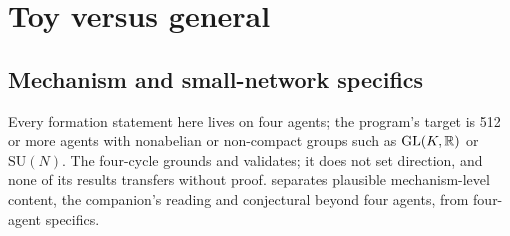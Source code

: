 \section{Toy versus general}
\label{comp:ch14-toy}

\subsection{Mechanism and small-network specifics}

Every formation statement here lives on four agents; the program's target is 512 or more agents with
nonabelian or non-compact groups such as $\mathrm{GL}(K,\mathbb R)$ or $\mathrm{SU}(N)$. The four-cycle grounds and
validates; it does not set direction, and none of its results transfers without proof.
 separates plausible mechanism-level content, the companion's reading and
conjectural beyond four agents, from four-agent specifics.

